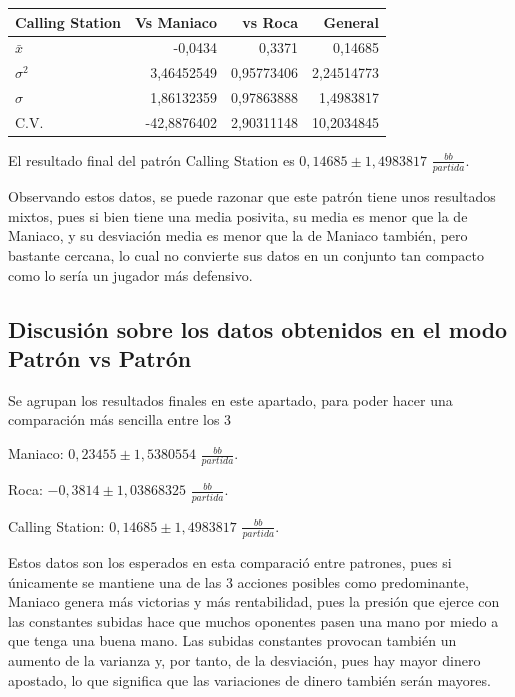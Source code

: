 \begin{longtable}[c]{lrrr}
\hline
Calling Station & Vs Maniaco & vs Roca & General \\ \hline
$\bar{x}$ & -0,0434 & 0,3371 & 0,14685 \\ 
$\sigma^2$ & 3,46452549 & 0,95773406 & 2,24514773 \\ 
$\sigma$ & 1,86132359 & 0,97863888 & 1,4983817 \\ 
C.V. & -42,8876402 & 2,90311148 & 10,2034845 \\ \hline
\end{longtable}


El resultado final del patrón Calling Station es $ 0,14685\pm1,4983817$  $\frac{bb}{partida}$.

\smallskip

Observando estos datos, se puede razonar que este patrón tiene unos resultados mixtos, pues si bien tiene una media posivita, su media es menor que la de Maniaco, y su desviación media es menor que la de Maniaco también, pero bastante cercana, lo cual no convierte sus datos en un conjunto tan compacto como lo sería un jugador más defensivo.
\newpage

\subsection{Discusión sobre los datos obtenidos en el modo Patrón vs Patrón}

Se agrupan los resultados finales en este apartado, para poder hacer una comparación más sencilla entre los 3

\vspace{5mm} %

Maniaco:  $0,23455\pm1,5380554$ $\frac{bb}{partida}$.

Roca: $-0,3814\pm1,03868325$ $\frac{bb}{partida}$.

Calling Station: $ 0,14685\pm1,4983817 $ $\frac{bb}{partida}$.

\vspace{5mm} %
Estos datos son los esperados en esta comparació entre patrones, pues si únicamente se mantiene una de las 3 acciones posibles como predominante, Maniaco genera más victorias y más rentabilidad, pues la presión que ejerce con las constantes subidas hace que muchos oponentes pasen una mano por miedo a que tenga una buena mano. Las subidas constantes provocan también un aumento de la varianza y, por tanto, de la desviación, pues hay mayor dinero apostado, lo que significa que las variaciones de dinero también serán mayores.

